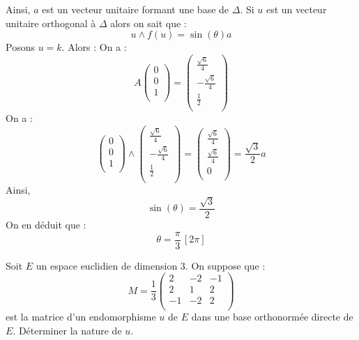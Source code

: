 \documentclass[a4paper,10pt]{report}
\begin{document}
\begin{enumerate}
Ainsi, $a$ est un vecteur unitaire formant une base de $\Delta$. Si $u$ est un vecteur unitaire orthogonal à $\Delta$ alors on sait que :
$$ u \wedge f(u) = \sin(\theta) a$$
Posons $u=k$. Alors :
On a :
$$ A \begin{pmatrix}
0 \\
0 \\
1 \\
\end{pmatrix} = \begin{pmatrix}
 \tfrac{\sqrt{6}}{4} \\
 -\tfrac{\sqrt{6}}{4} \\
 \tfrac{1}{2} \\
\end{pmatrix}$$
On a :
$$ 
\begin{pmatrix}
0 \\
0 \\
1 \\
\end{pmatrix} \wedge \begin{pmatrix}
 \tfrac{\sqrt{6}}{4} \\
 -\tfrac{\sqrt{6}}{4} \\
 \tfrac{1}{2} \\
\end{pmatrix} = \begin{pmatrix}
\tfrac{\sqrt{6}}{4}\\
\tfrac{\sqrt{6}}{4} \\
0 \\
\end{pmatrix} = \dfrac{\sqrt{3}}{2} a$$
Ainsi,
$$\sin(\theta)=\frac{\sqrt{3}}{2}$$
On en déduit que :
$$\theta=\dfrac{\pi}{3} \, [2\pi]$$
\end{enumerate}


\begin{Exercice}{} Soit $E$ un espace euclidien de dimension $3$. On suppose que :
$$ M = \dfrac{1}{3} \begin{pmatrix}
2 & -2 & -1 \\
2 & 1 & 2 \\
-1 & -2 & 2 \\
\end{pmatrix}$$
est la matrice d'un endomorphisme $u$ de $E$ dans une base orthonormée directe de $E$. Déterminer la nature de $u$.
\end{Exercice}
\end{document}
